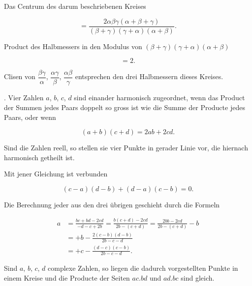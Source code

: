
Das Centrum des darum beschriebenen Kreises

\[
= \frac{2\alpha\beta\gamma(\alpha+\beta+\gamma)}{(\beta+\gamma)(\gamma+\alpha)(\alpha+\beta)}.
\]

Product des Halbmessers in den Modulus von $(\beta+\gamma)(\gamma+\alpha)(\alpha+\beta)$

\[
= 2.
\]

Clisen von $\dfrac{\beta\gamma}{\alpha}$, $\dfrac{\alpha\gamma}{\beta}$, $\dfrac{\alpha\beta}{\gamma}$ entsprechen den drei Halbmessern dieses Kreises.

\medskip
{}. Vier Zahlen $a$, $b$, $c$, $d$ sind einander harmonisch zugeordnet, wenn das
Product der Summen jedes Paars doppelt so gross ist wie die Summe der
Producte jedes Paars, oder wenn

\[
(a+b)(c+d) = 2ab+2cd.
\]

Sind die Zahlen reell, so stellen sie vier Punkte in gerader Linie vor, die
hiernach harmonisch getheilt ist.

Mit jener Gleichung ist verbunden

\[
(c-a)(d-b)+(d-a)(c-b) = 0.
\]

Die Berechnung jeder aus den drei \"ubrigen geschieht durch die Formeln

\[
\begin{aligned}
a &= \frac{bc+bd-2cd}{-d-c+2b} = \frac{b(c+d)-2cd}{2b-(c+d)} = \frac{2bb-2cd}{2b-(c+d)}-b \\
  &= +b-\frac{2(c-b)(d-b)}{2b-c-d} \\
  &= +c-\frac{(d-c)(c-b)}{2b-c-d}.
\end{aligned}
\]

Sind $a$, $b$, $c$, $d$ complexe Zahlen, so liegen die dadurch vorgestellten Punkte
in einem Kreise und die Producte der Seiten $ac.bd$ und $ad.bc$ sind gleich.
